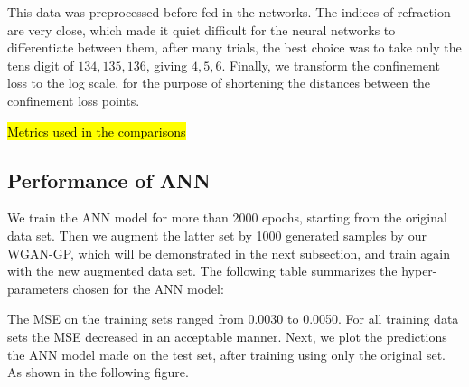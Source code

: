 \documentclass[draft, a4, 10pt, onecolumn]{IEEEtran}
\begin{document}
This data was preprocessed before fed in the networks. The indices of refraction  are very close, which made it quiet difficult for the neural networks to differentiate between them, after many trials, the best choice was to take only the tens digit of ${134, 135, 136}$, giving ${4, 5, 6}$. Finally, we transform the confinement loss to the log scale, for the purpose of shortening the distances between the confinement loss points.

\hl{Metrics used in the comparisons}


\subsection{Performance of ANN}

We train the ANN model for more than 2000 epochs, starting from the original data set. Then we augment the latter set by 1000 generated samples by our WGAN-GP, which will be demonstrated in the next subsection, and train again with the new augmented data set. The following table summarizes the hyper-parameters chosen for the ANN model:
\begin{table}[h]
\centering
{}
\caption{Hyper-parameters chosen for the ANN model, where $\beta_{1}$ and $\beta_{2}$ are a part of Adam parameters}
\end{table}

\newpage
The MSE on the training sets ranged from 0.0030 to 0.0050. For all training data sets the MSE decreased in an acceptable manner. Next, we plot the predictions the ANN model made on the test set, after training using only the original set. As shown in the following figure.
\end{document}
